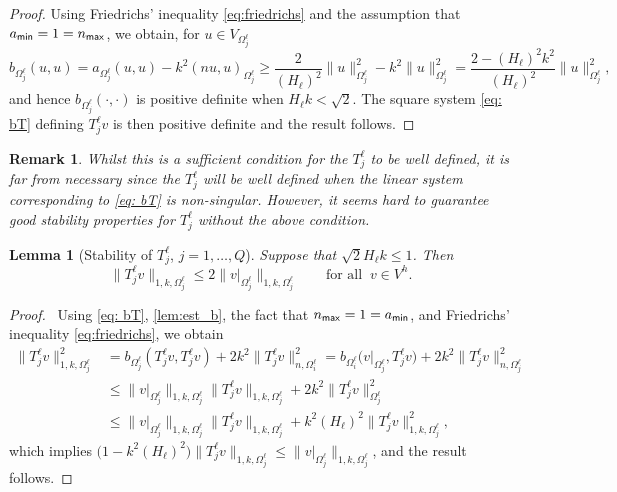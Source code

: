 \documentclass[numbers,webpdf,imaiai]{ima-authoring-template}%
\theoremstyle{thmstyletwo}%
\newtheorem{lemma}[theorem]{Lemma}
\newtheorem{remark}[theorem]{Remark}
\numberwithin{equation}{section}
\numberwithin{equation}{section}
\newcommand{\amin}{a_{\textup{\textsf{min}}}}
\newcommand{\nmax}{n_{\textup{\textsf{max}}}}
\renewcommand{\kappa}{k}
\begin{document}
{\begin{proof}
Using Friedrichs' inequality \eqref{eq:friedrichs} and the assumption that $\amin = 1 = \nmax$, we obtain, for $u\in V_{\Omega_j^\ell}$
\begin{equation*}
	b_{{\Omega^\ell_j}}(u,u) = a_{{\Omega^\ell_j}}(u,u) - k^2({n}u,u)_{{\Omega^\ell_j}} 
	\ge \frac{2}{{{(H_\ell)}}^2}\|u\|_{{\Omega^\ell_j}}^2 - k^2\|u\|_{{\Omega^\ell_j}}^2 
	= \frac{2-{{(H_\ell)}}^2k^2}{{{(H_\ell)}}^2}\|u\|_{{\Omega^\ell_j}}^2,
\end{equation*}
and hence $b_{{\Omega^\ell_j}}(\cdot,\cdot)$ is positive definite when $H_\ell k < \sqrt{2}$. 
The square system \eqref{eq: bT} defining $T_j^\ell v$ is then positive definite and the result follows.
\end{proof}

\begin{remark}
Whilst this is a sufficient condition for the ${T_j^\ell}$ to be well defined, it is
far from necessary since the ${T_j^\ell}$ will be well defined when the linear system corresponding to \eqref{eq: bT} is non-singular. 
However, it seems hard to guarantee good stability properties for $T_j^\ell$ without the above condition.
\end{remark}



\begin{lemma}[Stability of ${T_j^\ell}$, $j=1,\ldots,Q$]
\label{lemma_3_6}
Suppose that $\sqrt{2} {H_\ell}\kappa \le 1$.  Then
\begin{equation}\label{eq: 3_31}
	\|{T_j^\ell} v\|_{1,k,{\Omega^\ell_j}} \le 2\big\|v|_{{\Omega^\ell_j}}\big\|_{1,k,{\Omega^\ell_j}} 
	\qquad \text{for all} \;\; v \in V^h.
\end{equation}
\end{lemma}

\begin{proof}\,
Using \eqref{eq: bT}, \eqref{lem:est_b}, the fact that $\nmax = 1 = \amin$, and Friedrichs' inequality \eqref{eq:friedrichs}, we obtain
\begin{align*}
	\|{T_j^\ell} v\|^2_{1,k,{\Omega^\ell_j}} 
	&= b_{{\Omega^\ell_j}}({T_j^\ell} v,{T_j^\ell} v) + 2k^2\|T_j^\ell v\|_{n,\Omega_i^\ell}^2 
	= b_{\Omega_i^\ell}\bigl(v|_{\Omega^\ell_j},{T_j^\ell} v\bigr) + 2k^2\|T_j^\ell v\|_{n,\Omega^\ell_j}^2
	\\
	&\le \big\|v|_{\Omega^\ell_j}\big\|_{1,k,\Omega^\ell_j}\|T_j^\ell v\|_{1,k,\Omega^\ell_j} 
	+ 2k^2\|T_j^\ell v\|_{\Omega^\ell_j}^2
	\\
	&\le \big\|v|_{\Omega^\ell_j}\big\|_{1,k,\Omega^\ell_j}\|{T_j^\ell} v\|_{1,k,\Omega^\ell_j} 
	+ k^2(H_\ell)^2\|T_j^\ell v\|^2_{1,k,\Omega^\ell_j},
\end{align*}
which implies 
$\bigl(1-k^2 (H_\ell)^2\bigr)\|T_j^\ell v\|_{1,k,\Omega^\ell_j} \le \big\|v|_{\Omega^\ell_j}\big\|_{1,k,\Omega^\ell_j}$, 
and the result follows.
\end{proof}


}
\end{document}
